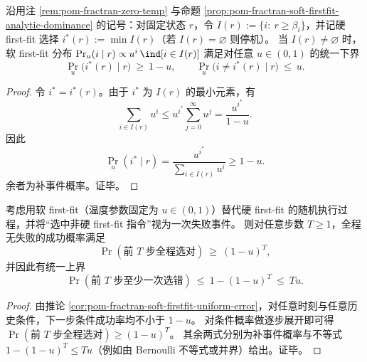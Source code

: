 \begin{corollary}\label{cor:pom-fractran-soft-firstfit-uniform-error}
沿用注 \ref{rem:pom-fractran-zero-temp} 与命题 \ref{prop:pom-fractran-soft-firstfit-analytic-dominance} 的记号：对固定状态 \(r\)，令
\(
I(r):=\{i:\ r\ge \beta_i\}
\)，并记硬 first-fit 选择
\(
i^\ast(r):=\min I(r)
\)（若 \(I(r)=\varnothing\) 则停机）。
当 \(I(r)\neq\varnothing\) 时，软 first-fit 分布
\(
\Pr_u(i\mid r)\propto u^i\,\ind[i\in I(r)]
\)
满足对任意 \(u\in(0,1)\) 的统一下界
\[
\Pr_u\bigl(i^\ast(r)\mid r\bigr)\ \ge\ 1-u,
\qquad
\Pr_u\bigl(i\neq i^\ast(r)\mid r\bigr)\ \le\ u.
\]
\end{corollary}
\begin{proof}
令 \(i^\ast=i^\ast(r)\)。由于 \(i^\ast\) 为 \(I(r)\) 的最小元素，有
\[
\sum_{i\in I(r)}u^i
\le
u^{i^\ast}\sum_{j=0}^{\infty}u^j
=
\frac{u^{i^\ast}}{1-u}.
\]
因此
\[
\Pr_u(i^\ast\mid r)
=
\frac{u^{i^\ast}}{\sum_{i\in I(r)}u^i}
\ge
1-u.
\]
余者为补事件概率。证毕。
\end{proof}

\begin{corollary}\label{cor:pom-fractran-soft-firstfit-temp-time-tradeoff}
考虑用软 first-fit（温度参数固定为 \(u\in(0,1)\)）替代硬 first-fit 的随机执行过程，并将“选中非硬 first-fit 指令”视为一次失败事件。
则对任意步数 \(T\ge 1\)，全程无失败的成功概率满足
\[
\Pr(\text{前 }T\text{ 步全程选对})\ \ge\ (1-u)^T,
\]
并因此有统一上界
\[
\Pr(\text{前 }T\text{ 步至少一次选错})\ \le\ 1-(1-u)^T\ \le\ Tu.
\]
\end{corollary}
\begin{proof}
由推论 \ref{cor:pom-fractran-soft-firstfit-uniform-error}，对任意时刻与任意历史条件，下一步条件成功率均不小于 \(1-u\)。
对条件概率做逐步展开即可得
\(
\Pr(\text{前 }T\text{ 步全程选对})\ge (1-u)^T
\)。
其余两式分别为补事件概率与不等式 \(1-(1-u)^T\le Tu\)（例如由 Bernoulli 不等式或并界）给出。证毕。
\end{proof}

